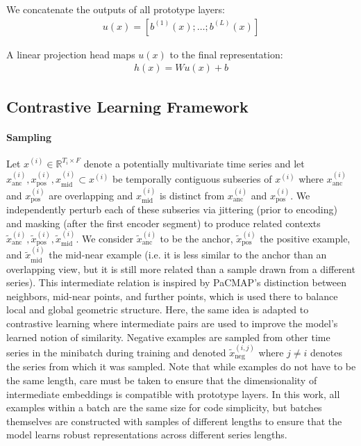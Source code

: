 \documentclass{article}
\newcommand{\R}{\mathbb R}
\begin{document}
We concatenate the outputs of all prototype layers: 
\begin{align*}
    u(x) = \left[ b^{(1)}(x); \ldots; b^{(L)}(x) \right]
\end{align*}

A linear projection head maps $u(x)$ to the final representation: 
\begin{align*}
    h(x) = W u(x) + b
\end{align*}

\subsection{Contrastive Learning Framework}
\label{subsec:loss}

\paragraph{Sampling} Let $x^{(i)} \in \R^{T_i \times F}$ denote a potentially multivariate time series and let $x_{\text{anc}}^{(i)}, x_{\text{pos}}^{(i)}, x_{\text{mid}}^{(i)} \subset x^{(i)}$ be temporally contiguous subseries of $x^{(i)}$ where $x_{\text{anc}}^{(i)}$ and $x_{\text{pos}}^{(i)}$ are overlapping and $x_{\text{mid}}^{(i)}$ is distinct from $x_{\text{anc}}^{(i)}$ and $x_{\text{pos}}^{(i)}$. We independently perturb each of these subseries via jittering (prior to encoding) and masking (after the first encoder segment) to produce related contexts $\tilde x_{\text{anc}}^{(i)}, \tilde x_{\text{pos}}^{(i)}, \tilde x_{\text{mid}}^{(i)}$. We consider $\tilde x_{\text{anc}}^{(i)}$ to be the anchor, $\tilde x_{\text{pos}}^{(i)}$ the positive example, and $\tilde x_{\text{mid}}^{(i)}$ the mid-near example (i.e. it is less similar to the anchor than an overlapping view, but it is still more related than a sample drawn from a different series). This intermediate relation is inspired by PaCMAP's distinction between neighbors, mid-near points, and further points, which is used there to balance local and global geometric structure. Here, the same idea is adapted to contrastive learning where intermediate pairs are used to improve the model's learned notion of similarity. Negative examples are sampled from other time series in the minibatch during training and denoted $\tilde x_{\text{neg}}^{(i, j)}$ where $j \neq i$ denotes the series from which it was sampled. Note that while examples do not have to be the same length, care must be taken to ensure that the dimensionality of intermediate embeddings is compatible with prototype layers. In this work, all examples within a batch are the same size for code simplicity, but batches themselves are constructed with samples of different lengths to ensure that the model learns robust representations across different series lengths. 
\end{document}
